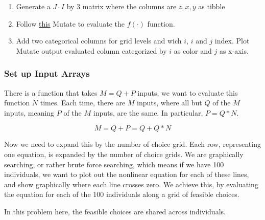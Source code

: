 \documentclass[
]{book}
\providecommand{\tightlist}{%
  \setlength{\itemsep}{0pt}\setlength{\parskip}{0pt}}
\begin{document}
\begin{enumerate}
\def\labelenumi{\arabic{enumi}.}
\tightlist
\item
  Generate a \(J \cdot I\) by \(3\) matrix where the columns are \(z,x,y\) as tibble
\item
  Follow \href{https://fanwangecon.github.io/R4Econ/function/mutatef/fs_funceval.html}{this} Mutate to evaluate the \(f(\cdot)\) function.
\item
  Add two categorical columns for grid levels and wich \(i\), \(i\) and \(j\) index. Plot Mutate output evaluated column categorized by \(i\) as color and \(j\) as x-axis.
\end{enumerate}

\hypertarget{set-up-input-arrays-1}{%
\subsubsection{Set up Input Arrays}\label{set-up-input-arrays-1}}

There is a function that takes \(M=Q+P\) inputs, we want to evaluate this function \(N\) times. Each time, there are \(M\) inputs, where all but \(Q\) of the \(M\) inputs, meaning \(P\) of the \(M\) inputs, are the same. In particular, \(P=Q*N\).

\[M = Q+P = Q + Q*N\]

Now we need to expand this by the number of choice grid. Each row, representing one equation, is expanded by the number of choice grids. We are graphically searching, or rather brute force searching, which means if we have 100 individuals, we want to plot out the nonlinear equation for each of these lines, and show graphically where each line crosses zero. We achieve this, by evaluating the equation for each of the 100 individuals along a grid of feasible choices.

In this problem here, the feasible choices are shared across individuals.
\end{document}
